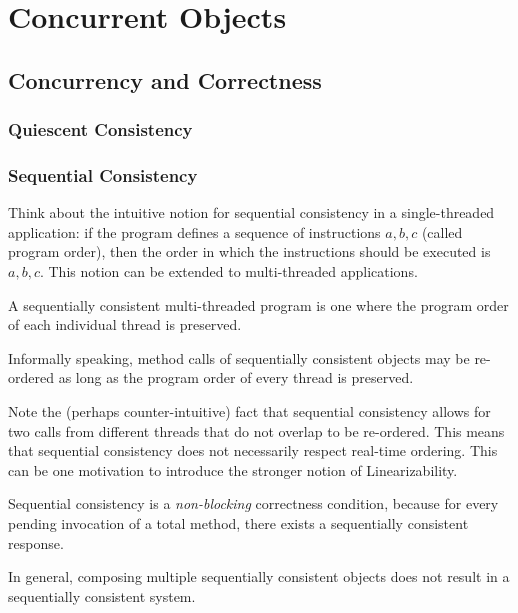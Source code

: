 \chapter{Concurrent Objects}\label{chp:concurrent_objects}
\minitoc

\section{Concurrency and Correctness}
\subsection{Quiescent Consistency} \label{sec:quiescent_consistency}

\subsection{Sequential Consistency}
Think about the intuitive notion for sequential consistency in a single-threaded application: if the program defines a sequence of instructions $a,b,c$ (called program order), then the order in which the instructions should be executed is $a,b,c$. This notion can be extended to multi-threaded applications.

\begin{definition}
    A sequentially consistent multi-threaded program is one where the program order of each individual thread is preserved.
\end{definition}

Informally speaking, method calls of sequentially consistent objects may be re-ordered as long as the program order of every thread is preserved.

Note the (perhaps counter-intuitive) fact that sequential consistency allows for two calls from different threads that do not overlap to be re-ordered. This means that sequential consistency does not necessarily respect real-time ordering. This can be one motivation to introduce the stronger notion of Linearizability.

\begin{lemma}
    Sequential consistency is a \textit{non-blocking} correctness condition, because for every pending invocation of a total method, there exists a sequentially consistent response.
\end{lemma}

\begin{lemma}
    In general, composing multiple sequentially consistent objects does not result in a sequentially consistent system.
\end{lemma}

